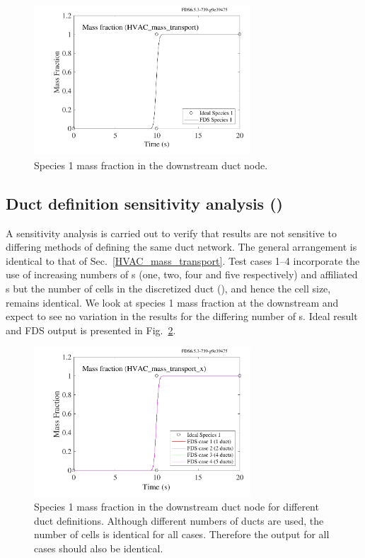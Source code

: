 \documentclass[11pt]{book}
\begin{document}
\begin{figure}[ht]
\centering
\includegraphics[height=2.2in]{SCRIPT_FIGURES/HVAC_mass_transport}
\caption[ test case]{Species \num{1} mass fraction in the downstream duct node.}
\label{fig_HVAC_mass_transport}
\end{figure}

\subsection{Duct definition sensitivity analysis (\texorpdfstring{}{HVAC\_mass\_transport\_\x})}
\label{HVAC_mass_transport_1}
\label{HVAC_mass_transport_2}
\label{HVAC_mass_transport_3}
\label{HVAC_mass_transport_4}
A sensitivity analysis is carried out to verify that results are not sensitive to differing methods of defining the same duct network. The general arrangement is identical to that of Sec.~\ref{HVAC_mass_transport}. Test cases \numrange{1}{4} incorporate the use of increasing numbers of s (one, two, four and five respectively) and affiliated s but the number of cells in the discretized duct (), and hence the cell size, remains identical. We look at species \num{1} mass fraction at the downstream  and expect to see no variation in the results for the differing number of s. Ideal result and FDS output is presented in Fig.~\ref{fig_HVAC_mass_transport_x}.

\begin{figure}[ht]
\centering
\includegraphics[height=2.2in]{SCRIPT_FIGURES/HVAC_mass_transport_x}
\caption[ test case]{Species \num{1} mass fraction in the downstream duct node for different duct definitions. Although different numbers of ducts are used, the number of cells is identical for all cases. Therefore the output for all cases should also be identical.}
\label{fig_HVAC_mass_transport_x}
\end{figure}
\end{document}
